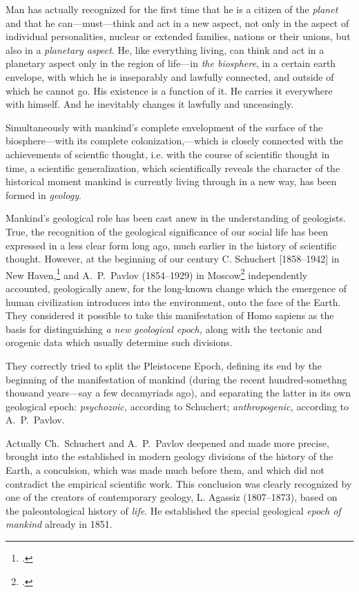 Man has actually recognized for the first time that he is a citizen of the
\emph{planet} and that he can---must---think and act in a new aspect, not only
in the aspect of individual personalities, nuclear or extended families,
nations or their unions, but also in a \emph{planetary aspect}.  He, like
everything living, can think and act in a planetary aspect only in the region
of life---in \emph{the biosphere}, in a certain earth envelope, with which he
is inseparably and lawfully connected, and outside of which he cannot go.  His
existence is a function of it.  He carries it everywhere with himself.  And he
inevitably changes it lawfully and unceasingly.


\Section \label{sec:15}
Simultaneously with mankind's complete envelopment of the surface of the
biosphere---with its complete colonization,---which is closely connected
with the achievements of scientfic thought, i.e. with the course of scientific
thought in time, a scientific generalization, which scientifically reveals the
character of the historical moment mankind is currently living through in a new
way, has been formed in \emph{geology}.

Mankind's geological role has been cast anew in the understanding of
geologists.  True, the recognition of the geological significance of our social
life has been expressed in a less clear form long ago, much earlier in the
history of scientific thought.  However, at the beginning of our century C.
Schuchert [1858--1942] in New
Haven,\footcite[80]{schuchert1933geology} and A.~P.\ Pavlov (1854--1929) in
Moscow\foreignlanguage{russian}{\footcite[с.~105 и
сл.]{pavlov1936geologicheskaya}} independently accounted, geologically anew,
for the long-known change which the emergence of human civilization introduces
into the environment, onto the face of the Earth.  They considered it possible
to take this manifestation of Homo sapiens as the basis for distinguishing
\emph{a new geological epoch,} along with the tectonic and orogenic data which
usually determine such divisions.

They correctly tried to split the Pleistocene Epoch, defining its end by the
beginning of the manifestation of mankind (during the recent hundred-somethng
thousand years---say a few decamyriads ago), and separating the latter in its
own geological epoch: \emph{psychozoic,} according to Schuchert;
\emph{anthropogenic,} according to A.~P.\ Pavlov.

Actually Ch.\ Schuchert and A.~P.\ Pavlov deepened and made more precise,
brought into the established in modern geology divisions of the history of the
Earth, a conculsion, which was made much before them, and which did not
contradict the empirical scientific work.  This conclusion was clearly
recognized by one of the creators of contemporary geology, L. Agassiz
(1807--1873), based on the paleontological history of \emph{life}.  He
established the special geological \emph{epoch of mankind} already in 1851.

